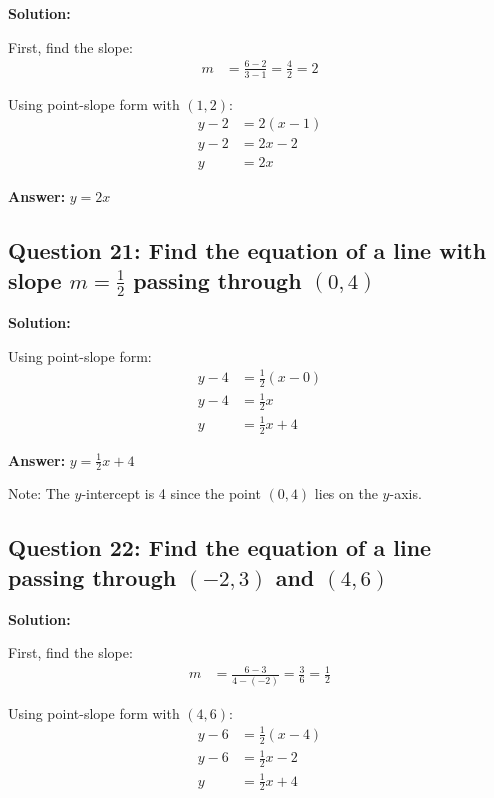 \documentclass[12pt]{article}
\begin{document}
\noindent\textbf{Solution:}

First, find the slope:
\begin{align*}
m &= \frac{6 - 2}{3 - 1} = \frac{4}{2} = 2
\end{align*}

Using point-slope form with $(1, 2)$:
\begin{align*}
y - 2 &= 2(x - 1) \\
y - 2 &= 2x - 2 \\
y &= 2x
\end{align*}

\textbf{Answer: } $y = 2x$

\vspace{0.3cm}

\subsection*{Question 21: Find the equation of a line with slope $m = \frac{1}{2}$ passing through $(0, 4)$}

\noindent\textbf{Solution:}

Using point-slope form:
\begin{align*}
y - 4 &= \frac{1}{2}(x - 0) \\
y - 4 &= \frac{1}{2}x \\
y &= \frac{1}{2}x + 4
\end{align*}

\textbf{Answer: } $y = \frac{1}{2}x + 4$

Note: The $y$-intercept is 4 since the point $(0, 4)$ lies on the $y$-axis.

\vspace{0.3cm}

\subsection*{Question 22: Find the equation of a line passing through $(-2, 3)$ and $(4, 6)$}

\noindent\textbf{Solution:}

First, find the slope:
\begin{align*}
m &= \frac{6 - 3}{4 - (-2)} = \frac{3}{6} = \frac{1}{2}
\end{align*}

Using point-slope form with $(4, 6)$:
\begin{align*}
y - 6 &= \frac{1}{2}(x - 4) \\
y - 6 &= \frac{1}{2}x - 2 \\
y &= \frac{1}{2}x + 4
\end{align*}
\end{document}
